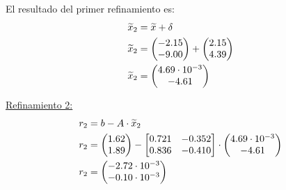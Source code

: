 \documentclass[../main.tex]{subfiles}
\begin{document}
\begin{example}
\begin{enumerate}
                    El resultado del primer refinamiento es:
                    \begin{equation}
                        \begin{split}
                            \widetilde{x}_2 &= \widetilde{x} + \delta \\
                            \widetilde{x}_2 &= \begin{pmatrix*}[r]
                                -2.15\\
                                -9.00
                            \end{pmatrix*} + 
                            \begin{pmatrix*}[r]
                                2.15\\
                                4.39
                            \end{pmatrix*} \\
                            \widetilde{x}_2 &= \begin{pmatrix*}[r]
                                4.69 \cdot 10^{-3}\\
                                \hfill -4.61 \hfill
                            \end{pmatrix*}
                        \end{split}
                    \end{equation}

                    \underline{Refinamiento 2:}
                    \begin{equation}
                        \begin{split}
                            r_2 &= b - A \cdot \widetilde{x}_2 \\
                            r_2 &= \begin{pmatrix*}[r]
                                1.62\\
                                1.89
                            \end{pmatrix*} -
                            \begin{bmatrix*}[r]
                                0.721 & -0.352\\
                                0.836 & -0.410
                            \end{bmatrix*} \cdot
                            \begin{pmatrix*}[r]
                                4.69 \cdot 10^{-3}\\
                                \hfill -4.61 \hfill
                            \end{pmatrix*} \\
                            r_2 &= \begin{pmatrix*}[r]
                                -2.72 \cdot 10^{-3}\\
                                -0.10 \cdot 10^{-3}
                            \end{pmatrix*}
                        \end{split}
                    \end{equation}


\end{enumerate}
\end{example}
\end{document}
